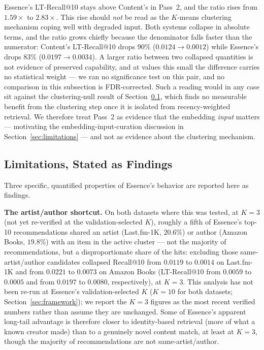 \documentclass[11pt,a4paper]{article}
\begin{document}
Essence's LT-Recall@10 stays above Content's in Pass~2, and the ratio
rises from $1.59\times$ to $2.83\times$. This rise should \emph{not} be read
as the $K$-means clustering mechanism coping well with degraded input. Both
systems collapse in absolute terms, and the ratio grows chiefly because the
denominator falls faster than the numerator: Content's LT-Recall@10 drops
$90\%$ ($0.0124\to0.0012$) while Essence's drops $83\%$
($0.0197\to0.0034$). A larger ratio between two collapsed quantities is not
evidence of preserved capability, and at values this small the difference
carries no statistical weight --- we ran no significance test on this pair,
and no comparison in this subsection is FDR-corrected. Such a reading would
in any case sit against the clustering-null result of
Section~\ref{sec:limitations-findings}, which finds no measurable benefit
from the clustering step once it is isolated from recency-weighted
retrieval. We therefore treat Pass~2 as evidence that the embedding
\emph{input} matters --- motivating the embedding-input-curation discussion
in Section~\ref{sec:limitations} --- and not as evidence about the
clustering mechanism.

\subsection{Limitations, Stated as Findings}
\label{sec:limitations-findings}

Three specific, quantified properties of Essence's behavior are reported
here as findings.

\textbf{The artist/author shortcut.} On both datasets where this was
tested, at $K=3$ (not yet re-verified at the validation-selected $K$),
roughly a fifth of
Essence's top-10 recommendations shared an artist (Last.fm-1K, $20.6\%$)
or author (Amazon Books, $19.8\%$) with an item in the active cluster ---
not the majority of recommendations, but a disproportionate share of the
hits: excluding those same-artist/author candidates collapsed Recall@10
from $0.0119$ to $0.0014$ on Last.fm-1K and from $0.0221$ to $0.0073$ on
Amazon Books (LT-Recall@10 from $0.0059$ to $0.0005$ and from $0.0197$ to
$0.0080$, respectively), at $K=3$. This analysis has not been re-run at
Essence's validation-selected $K$ ($K=10$ for both datasets;
Section~\ref{sec:framework}); we report the $K=3$ figures as the most
recent verified numbers rather than assume they are unchanged. Some of
Essence's apparent long-tail advantage is therefore closer to
identity-based retrieval (more of what a known creator made) than to a
genuinely novel content match, at least at $K=3$, though the majority of
recommendations are not same-artist/author.
\end{document}
